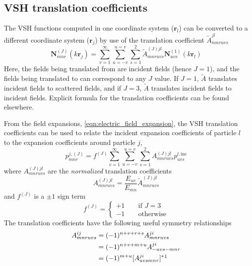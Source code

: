 \documentclass[11pt]{article}
\begin{document}
\subsection{VSH translation coefficients}
The VSH functions computed in one coordinate system ($\bm{r}_l$) can be converted to a different coordinate system ($\bm{r}_j$) by use of the translation coefficient $\widetilde{A}_{mnruvs}^{jl}$
\begin{equation}
    \bm{N}_{mnr}^{(J)}(k\bm{r}_j) = \sum_{v=1}^\infty \sum_{u=-v}^{u=v} \sum_{s=1}^2
    \widetilde{A}_{mnruvs}^{(J)jl} \bm{N}_{uvs}^{(1)}(k\bm{r}_l)
    \label{eqn:VSHW_translation}
\end{equation}
Here, the fields being translated from are incident fields (hence $J=1$), and the fields being translated to can correspond to any $J$ value.
If $J=1$, $\widetilde{A}$ translates incident fields to scattered fields, and if $J=3$, $\widetilde{A}$ translates incident fields to incident fields.
Explicit formula for the translation coefficients can be found elsewhere. \cite{Xu_1998}

From the field expansions, \cref{eqn:electric_field_expansion}, the VSH translation coefficients can be used to relate the incident expansion coefficients of particle $l$ to the expansion coefficients around particle $j$,
\begin{equation}
    p_{mnr}^{j,(J)} = f^{(J)}\sum_{v=1}^\infty \sum_{u=-v}^{u=v} \sum_{s=1}^2
    A_{mnruvs}^{(J)jl} p_{uvs}^{l,\text{inc}}
    \label{eqn:VSHW_translation_normalized}
\end{equation}
where $A_{mnruvs}^{(J)jl}$ are the \emph{normalized} translation coefficients
\begin{equation}
    A_{mnruvs}^{(J)jl} = \frac{E_{uv}}{E_{mn}} \widetilde{A}_{mnruvs}^{(J)jl}
\end{equation}
and $f^{(J)}$ is a $\pm 1$ sign term
\begin{equation}
    f^{(J)} =
    \begin{cases}
        +1 \qquad \text{if } J = 3 \\
        -1 \qquad \text{otherwise}
    \end{cases}
    \label{eqn:outgoing_factor}
\end{equation}
The translation coefficients have the following useful symmetry relationships \cite{hovenier1996light}
\begin{subequations}
    \label{eqn:vsh_symmetry}
    \begin{align}
        A_{mnruvs}^{ij} &= (-1)^{n+v+r+s} A_{mnruvs}^{ji} \\
                        &= (-1)^{n+v+m+u} A_{-uvs-mnr}^{ji} \\
                        &= (-1)^{m+u}[A_{uvsmnr}^{ji}]^* \label{eqn:vsh_symmetry_special} \footnotemark
    \end{align}
\end{subequations}
\end{document}
